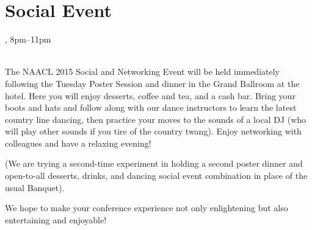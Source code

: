 \clearpage
\section{Social Event}
\setheaders{}{\daydateyear}

\begin{center}



\daydateyear, 8pm--11pm \vspace{1em}\\
\BanquetLoc\\
\end{center}

The NAACL 2015 Social and Networking Event will be held immediately
following the Tuesday Poster Session and dinner in the Grand Ballroom
at the hotel. Here you will enjoy desserts, coffee and tea, and a cash
bar. Bring your boots and hats and follow along with our dance
instructors to learn the latest country line dancing, then practice
your moves to the sounds of a local DJ (who will play other sounds if
you tire of the country twang).  Enjoy networking with colleagues and
have a relaxing evening!

(We are trying a second-time experiment in holding a second poster dinner
and open-to-all desserts, drinks, and dancing social event combination
in place of the usual Banquet).

We hope to make your conference experience not only enlightening but
also entertaining and enjoyable! 
